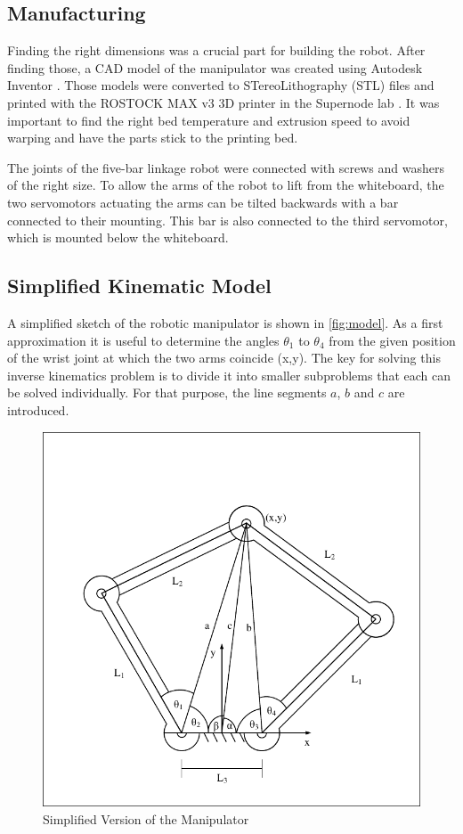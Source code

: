 \documentclass{sig-alternate-05-2015}
\begin{document}
\subsection{Manufacturing}

Finding the right dimensions was a crucial part for building the robot. After finding those, a CAD model of the manipulator was created using Autodesk Inventor \cite{cad}. Those models were converted to STereoLithography (STL) files and printed with the ROSTOCK MAX v3 3D printer in the Supernode lab \cite{3D}. It was important to find the right bed temperature and extrusion speed to avoid warping and have the parts stick to the printing bed.

The joints of the five-bar linkage robot were connected with screws and washers of the right size. To allow the arms of the robot to lift from the whiteboard, the two servomotors actuating the arms can be tilted backwards with a bar connected to their mounting. This bar is also connected to the third servomotor, which is mounted below the whiteboard.

\subsection{Simplified Kinematic Model}\label{section1}

A simplified sketch of the robotic manipulator is shown in  \autoref{fig:model}. As a first approximation it is useful to determine the angles $\theta_1$ to $\theta_4$ from the given position of the wrist joint at which the two arms coincide (x,y). The key for solving this inverse kinematics problem is to divide it into smaller subproblems that each can be solved individually. For that purpose, the line segments $a$, $b$ and $c$ are introduced.
\begin{figure}[!h]
	\centering
	\includegraphics[width=.42\textwidth]{img/LinkDiagramSimple.pdf}
	\caption{Simplified Version of the Manipulator}\label{fig:model}\label{fig:sketch}
\end{figure}
\end{document}
